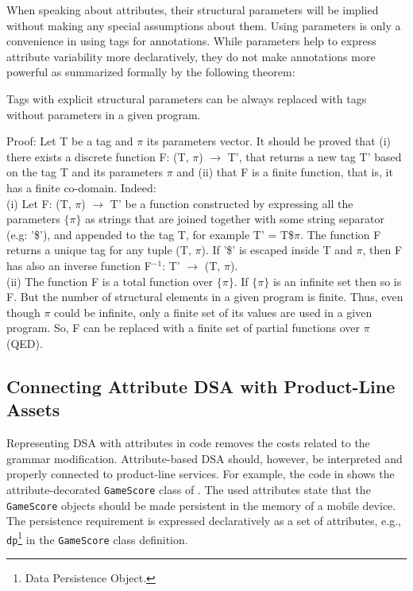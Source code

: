 When speaking about attributes, their structural parameters will be implied without making any special assumptions about them. Using parameters is only a convenience in using tags for annotations. While parameters help to express attribute variability more declaratively, they do not make annotations more powerful as summarized formally by the following theorem:

\begin{theorem}
\label{theo:tagParam}
Tags with explicit structural parameters can be always replaced with tags without parameters in a given program.
\end{theorem}

\noindent Proof: Let T be a tag and $\pi$ its parameters vector. It should be proved that (i) there exists a discrete function F: (T, $\pi$) $\to$ T', that returns a new tag T' based on the tag T and its parameters $\pi$ and (ii) that F is a finite function, that is, it has a finite co-domain. Indeed:\\
(i) Let F: (T, $\pi$) $\to$ T' be a function constructed by expressing all the parameters $\{\pi\}$ as strings that are joined together with some string separator (e.g: '\$'), and appended to the tag T, for example T' = T\$$\pi$. The function F returns a unique tag for any tuple (T, $\pi$). If '\$' is escaped inside T and $\pi$, then F has also an inverse function F$^{-1}$: T' $\to$ (T, $\pi$).\\
(ii) The function F is a total function over $\{\pi\}$. If $\{\pi\}$ is an infinite set then so is F. But the number of structural elements in a given program is finite. Thus, even though $\pi$ could be infinite, only a finite set of its values are used in a given program. So, F can be replaced with a finite set of partial functions over $\pi$ (QED).

\subsection{Connecting Attribute DSA with Product-Line Assets}
\label{dsa.connect}

Representing DSA with attributes in code removes the costs related to the grammar modification. Attribute-based DSA should, however, be interpreted and properly connected to product-line services. For example, the code in  shows the attribute-decorated \texttt{Ga\-me\-Score} class of . The used attributes state that the \texttt{Ga\-me\-Score} objects should be made persistent in the memory of a mobile device. The persistence requirement is expressed declaratively as a set of attributes, e.g., \texttt{dp}\footnote{Data Persistence Object.} in the \texttt{Ga\-me\-Score} class definition.

